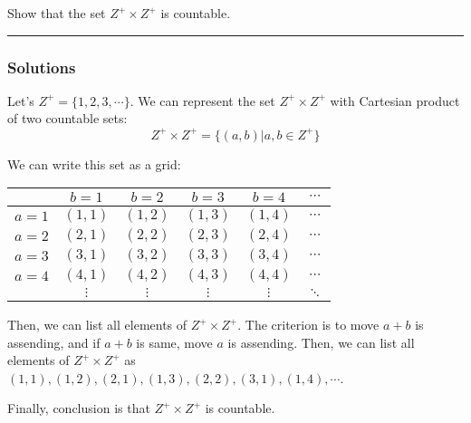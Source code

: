 \newpage
\begin{question}
Show that the set $Z^{+} \times Z^{+}$ is countable.
\end{question}

\par\noindent\rule{\textwidth}{0.5pt}

\subsubsection*{Solutions}

Let's $Z^{+} = \{1, 2, 3, \cdots\}$. We can represent the set $Z^{+} \times Z^{+}$ with Cartesian product of two countable sets:
$$Z^{+} \times Z^{+} = \{(a, b) | a, b \in Z^{+}\}$$

\noindent
We can write this set as a grid:
\begin{center}
    \begin{tabular}{|c|ccccc|}
        \hline
        & $b = 1$ & $b = 2$ & $b = 3$ & $b = 4$ & $\cdots$\\
        \hline
        $a = 1$& $(1, 1)$ & $(1, 2)$ & $(1, 3)$ & $(1, 4)$ & $\cdots$\\
        $a = 2$& $(2, 1)$ & $(2, 2)$ & $(2, 3)$ & $(2, 4)$ & $\cdots$\\
        $a = 3$& $(3, 1)$ & $(3, 2)$ & $(3, 3)$ & $(3, 4)$ & $\cdots$\\
        $a = 4$& $(4, 1)$ & $(4, 2)$ & $(4, 3)$ & $(4, 4)$ & $\cdots$\\
        & $\vdots$ & $\vdots$ & $\vdots$ & $\vdots$ & $\ddots$\\
        \hline
    \end{tabular}
\end{center}

\noindent
Then, we can list all elements of $Z^{+} \times Z^{+}$. The criterion is to move $a+b$ is assending, and if $a+b$ is same, move $a$ is assending. Then, we can list all elements of $Z^{+} \times Z^{+}$ as $(1, 1), (1, 2), (2, 1), (1, 3), (2, 2), (3, 1), (1, 4), \cdots$.

\bigskip
\noindent
Finally, conclusion is that $Z^{+} \times Z^{+}$ is countable.
